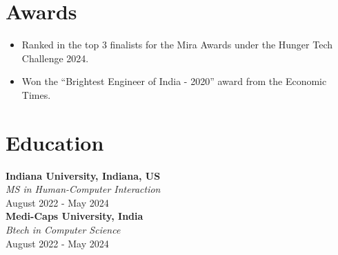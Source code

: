 \documentclass[a4paper,10pt]{article}
\begin{document}
\vspace{0.3cm}
\section*{Awards}
\begin{itemize}[left=0.15cm]
    \item Ranked in the top 3 finalists for the Mira Awards under the Hunger Tech Challenge 2024.
    \item Won the “Brightest Engineer of India - 2020” award from the Economic Times.
\end{itemize}

\vspace{0.3cm}
\section*{Education}
\textbf{Indiana University, Indiana, US} \\
\textit{MS in Human-Computer Interaction} \\
August 2022 - May 2024 \\
\textbf{Medi-Caps University, India} \\
\textit{Btech in Computer Science} \\
August 2022 - May 2024
\end{document}
